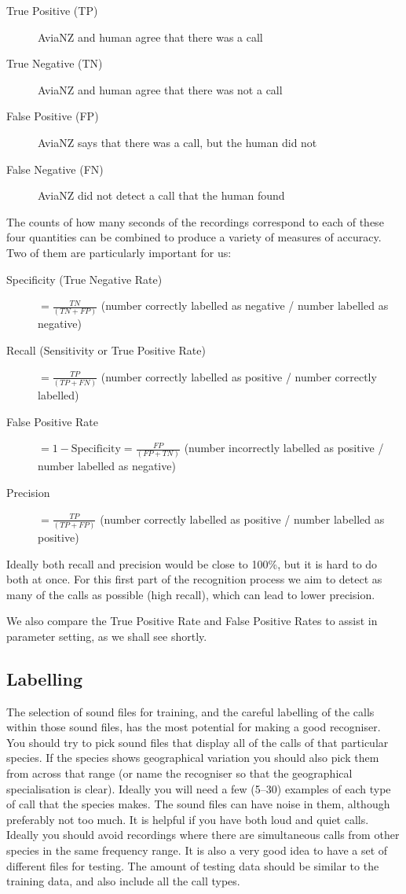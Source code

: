\documentclass{article}
\begin{document}
\begin{description}
\item[True Positive (TP)] AviaNZ and human agree that there was a call 
\item[True Negative (TN)] AviaNZ and human agree that there was not a call
\item[False Positive (FP)] AviaNZ says that there was a call, but the human did not
\item[False Negative (FN)] AviaNZ did not detect a call that the human found
\end{description}

The counts of how many seconds of the recordings correspond to each of these four quantities can be combined to produce a variety of measures of accuracy. Two of them are particularly important for us:

\begin{description}
\item[Specificity (True Negative Rate)] $= \frac{TN}{(TN + FP)}$ (number correctly labelled as negative / number labelled as negative)
\item[Recall (Sensitivity or True Positive Rate)] $= \frac{TP}{(TP + FN)}$ (number correctly labelled as positive / number correctly labelled) 
\item[False Positive Rate] $= 1 - \mathrm{Specificity} = \frac{FP}{(FP + TN)}$ (number incorrectly labelled as positive / number labelled as negative)
\item[Precision] $= \frac{TP}{(TP + FP)}$ (number correctly labelled as positive / number labelled as positive)
\end{description}

Ideally both recall and precision would be close to 100\%, but it is hard to do both at once. For this first part of the recognition process we aim to detect as many of the calls as possible (high recall), which can lead to lower precision. 

We also compare the True Positive Rate and False Positive Rates to assist in parameter setting, as we shall see shortly.

\subsection{Labelling}

The selection of sound files for training, and the careful labelling of the calls within those sound files, has the most potential for making a good recogniser. You should try to pick sound files that display all of the calls of that particular species. If the species shows geographical variation you should also pick them from across that range (or name the recogniser so that the geographical specialisation is clear).  Ideally you will need a few (5--30) examples of each type of call that the species makes. The sound files can have noise in them, although preferably not too much. It is helpful if you have both loud and quiet calls. Ideally you should avoid recordings where there are simultaneous calls from other species in the same frequency range. It is also a very good idea to have a set of different files for testing. The amount of testing data should be similar to the training data, and also include all the call types.
\end{document}
